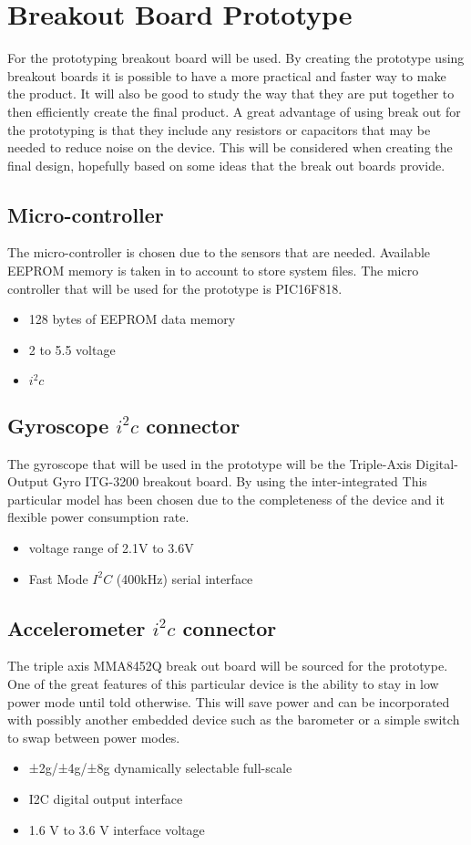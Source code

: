 \documentclass{report}
\begin{document}
\section{Breakout Board Prototype}
For the prototyping breakout board will be used. By creating the prototype using breakout boards it is possible to have a more practical and faster way to make the product. It will also be good to study the way that they are put together to then efficiently create the final product. A great advantage of using break out for the prototyping is that they include any resistors or capacitors that may be needed to reduce noise on the device. This will be considered when creating the final design, hopefully based on some ideas that the break out boards provide.
 
\subsection{Micro-controller}
The micro-controller is chosen due to the sensors that are needed. Available EEPROM memory is taken in to account to store system files. The micro controller that will be used for the prototype is PIC16F818. 
\begin{itemize}
\item 128 bytes of EEPROM data memory
\item 2 to 5.5 voltage
\item $i^2c$
\end{itemize}

\subsection{Gyroscope $i^2c$ connector}
The gyroscope that will be used in the prototype will be the Triple-Axis Digital-Output Gyro ITG-3200 breakout board. By using the inter-integrated 
This particular model has been chosen due to the completeness of the device and it flexible power consumption rate.
\begin{itemize}
\item voltage range of 2.1V to 3.6V
\item Fast Mode $I^2C$ (400kHz) serial interface
\end{itemize}
\subsection{Accelerometer $i^2c$ connector}
The triple axis MMA8452Q break out board will be sourced for the prototype. One of the great features of this particular device is the ability to stay in low power mode until told otherwise. This will save power and can be incorporated with possibly another embedded device such as the barometer or a simple switch to swap between power modes.
\begin{itemize}
\item ±2g/±4g/±8g dynamically selectable full-scale
\item I2C digital output interface
\item 1.6 V to 3.6 V interface voltage
\end{itemize}
\end{document}
